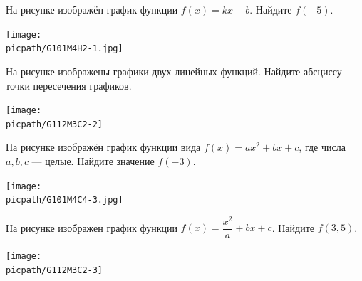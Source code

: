 \begin{class}[number=5]
	\begin{listofex}
		\item 
		\begin{minipage}[t]{\bodywidth}
				На рисунке изображён график функции \(f(x)=kx+b\). Найдите \(f(-5)\).
			\end{minipage}
		\begin{minipage}[t]{\picwidth}
				\texttt{[image: \\picpath/G101M4H2-1.jpg]}
			\end{minipage}
		\item
		\begin{minipage}[t]{\bodywidth}
			На рисунке изображены графики двух линейных функций. Найдите абсциссу точки пересечения графиков.
		\end{minipage}
		\begin{minipage}[t]{\picwidth}
			\texttt{[image: \\picpath/G112M3C2-2]}
		\end{minipage}
		\item
	\begin{minipage}[t]{\bodywidth}
			На рисунке изображён график функции вида \(f(x)=ax^2+bx+c\), где числа \(a, b, c\) --- целые. Найдите значение \(f(-3)\).
		\end{minipage}
	\begin{minipage}[t]{\picwidth}
			\texttt{[image: \\picpath/G101M4C4-3.jpg]}
		\end{minipage}
		
		\item
		\begin{minipage}[t]{\bodywidth}
			На рисунке изображен график функции \( f(x)=\dfrac{x^2}{a}+bx+c \). Найдите \( f(3,5) \).
		\end{minipage}
		\begin{minipage}[t]{\picwidth}
			\texttt{[image: \\picpath/G112M3C2-3]}
		\end{minipage}
		

\end{listofex}
\end{class}
